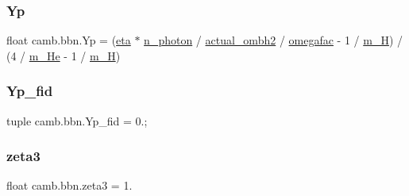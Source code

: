 \subsubsection{\texorpdfstring{Yp}{Yp}}
{\footnotesize\ttfamily float camb.\+bbn.\+Yp = (\mbox{\hyperlink{namespacecamb_1_1bbn_acbc137606c793f20e1ded220bbfab367}{eta}} $\ast$ \mbox{\hyperlink{namespacecamb_1_1bbn_aa1b409ea1a7b5f583772b3f5cc174be0}{n\+\_\+photon}} / \mbox{\hyperlink{namespacecamb_1_1bbn_a577a98b4b1732e27cc2e09844a6fe2ee}{actual\+\_\+ombh2}} / \mbox{\hyperlink{namespacecamb_1_1bbn_a9366441db17c0ca60e0fa48f8a8d796c}{omegafac}} -\/ 1 / \mbox{\hyperlink{namespacecamb_1_1bbn_aa3780f95e3d1ace78bfe399ae081a621}{m\+\_\+H}}) / (4 / \mbox{\hyperlink{namespacecamb_1_1bbn_addcae6f33c5419e66f9ae3006383c347}{m\+\_\+\+He}} -\/ 1 / \mbox{\hyperlink{namespacecamb_1_1bbn_aa3780f95e3d1ace78bfe399ae081a621}{m\+\_\+H}})}

\mbox{\label{namespacecamb_1_1bbn_ace4721f676cd3090adcf649ff5eb439d}} 
\subsubsection{\texorpdfstring{Yp\+\_\+fid}{Yp\_fid}}
{\footnotesize\ttfamily tuple camb.\+bbn.\+Yp\+\_\+fid = 0.;}

\mbox{\label{namespacecamb_1_1bbn_a484a30a2544ce82886fb2fe6860cc65c}} 
\subsubsection{\texorpdfstring{zeta3}{zeta3}}
{\footnotesize\ttfamily float camb.\+bbn.\+zeta3 = 1.}

